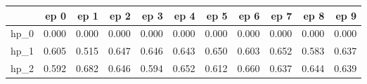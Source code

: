\begin{tabular}{lrrrrrrrrrr}
\toprule
{} &   ep 0 &   ep 1 &   ep 2 &   ep 3 &   ep 4 &   ep 5 &   ep 6 &   ep 7 &   ep 8 &   ep 9 \\
\midrule
hp\_0 &  0.000 &  0.000 &  0.000 &  0.000 &  0.000 &  0.000 &  0.000 &  0.000 &  0.000 &  0.000 \\
hp\_1 &  0.605 &  0.515 &  0.647 &  0.646 &  0.643 &  0.650 &  0.603 &  0.652 &  0.583 &  0.637 \\
hp\_2 &  0.592 &  0.682 &  0.646 &  0.594 &  0.652 &  0.612 &  0.660 &  0.637 &  0.644 &  0.639 \\
\bottomrule
\end{tabular}
